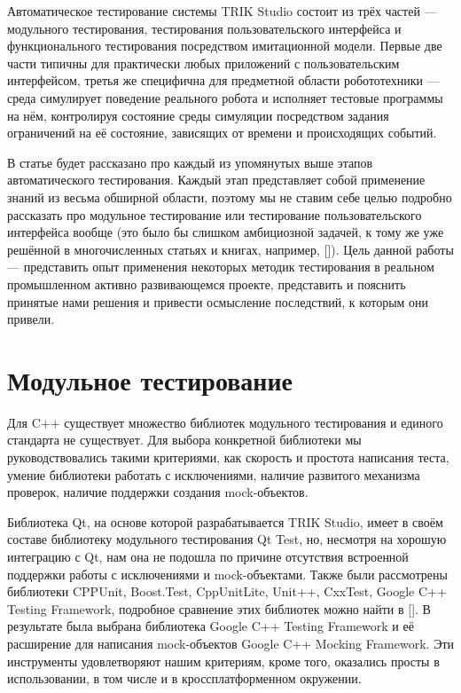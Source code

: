 ﻿\documentclass[conference]{IEEEtran}
\begin{document}
Автоматическое тестирование системы TRIK Studio состоит из трёх частей --- модульного 
тестирования, тестирования пользовательского интерфейса и функционального тестирования 
посредством имитационной модели. Первые две части типичны для практически любых приложений 
с пользовательским интерфейсом, третья же специфична для предметной области робототехники --- 
среда симулирует поведение реального робота и исполняет тестовые программы на нём, 
контролируя состояние среды симуляции посредством задания ограничений на её состояние, 
зависящих от времени и происходящих событий.

В статье будет рассказано про каждый из упомянутых выше этапов автоматического тестирования. 
Каждый этап представляет собой применение знаний из весьма обширной области, поэтому 
мы не ставим себе целью подробно рассказать про модульное тестирование или тестирование 
пользовательского интерфейса вообще (это было бы слишком амбициозной задачей, к тому 
же уже решённой в многочисленных статьях и книгах, например, []). Цель данной работы --- 
представить опыт применения некоторых методик тестирования в реальном промышленном 
активно развивающемся проекте, представить и пояснить принятые нами решения и привести 
осмысление последствий, к которым они привели.





\section{Модульное тестирование}
Для C++ существует множество библиотек модульного тестирования и единого стандарта 
не существует. Для выбора конкретной библиотеки мы руководствовались такими критериями, 
как скорость и простота написания теста, умение библиотеки работать с исключениями, 
наличие развитого механизма проверок, наличие поддержки создания mock-объектов. 

Библиотека Qt, на основе которой разрабатывается TRIK Studio, имеет в своём составе 
библиотеку модульного тестирования Qt Test, но, несмотря на хорошую интеграцию с Qt, 
нам она не подошла по причине отсутствия встроенной поддержки работы с исключениями 
и mock-объектами. Также были рассмотрены библиотеки CPPUnit, Boost.Test, CppUnitLite, 
Unit++, CxxTest, Google C++ Testing Framework, подробное сравнение этих библиотек можно 
найти в []. В результате была выбрана библиотека Google C++ Testing Framework и её 
расширение для написания mock-объектов Google C++ Mocking Framework. Эти инструменты 
удовлетворяют нашим критериям, кроме того, оказались просты в использовании, в том 
числе и в кроссплатформенном окружении. 
\end{document}
